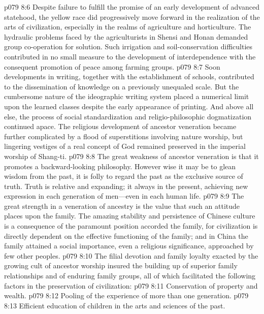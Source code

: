 \vs p079 8:6 Despite failure to fulfill the promise of an early development of advanced statehood, the yellow race did progressively move forward in the realization of the arts of civilization, especially in the realms of agriculture and horticulture. The hydraulic problems faced by the agriculturists in Shensi and Honan demanded group co\hyp{}operation for solution. Such irrigation and soil\hyp{}conservation difficulties contributed in no small measure to the development of interdependence with the consequent promotion of peace among farming groups.
\vs p079 8:7 Soon developments in writing, together with the establishment of schools, contributed to the dissemination of knowledge on a previously unequaled scale. But the cumbersome nature of the ideographic writing system placed a numerical limit upon the learned classes despite the early appearance of printing. And above all else, the process of social standardization and religio\hyp{}philosophic dogmatization continued apace. The religious development of ancestor veneration became further complicated by a flood of superstitions involving nature worship, but lingering vestiges of a real concept of God remained preserved in the imperial worship of Shang\hyp{}ti.
\vs p079 8:8 The great weakness of ancestor veneration is that it promotes a backward\hyp{}looking philosophy. However wise it may be to glean wisdom from the past, it is folly to regard the past as the exclusive source of truth. Truth is relative and expanding; it  always in the present, achieving new expression in each generation of men---even in each human life.
\vs p079 8:9 The great strength in a veneration of ancestry is the value that such an attitude places upon the family. The amazing stability and persistence of Chinese culture is a consequence of the paramount position accorded the family, for civilization is directly dependent on the effective functioning of the family; and in China the family attained a social importance, even a religious significance, approached by few other peoples.
\vs p079 8:10 The filial devotion and family loyalty exacted by the growing cult of ancestor worship insured the building up of superior family relationships and of enduring family groups, all of which facilitated the following factors in the preservation of civilization:
\pc \vs p079 8:11 \bibnobreakspace Conservation of property and wealth.
\vs p079 8:12 \bibnobreakspace Pooling of the experience of more than one generation.
\vs p079 8:13 \bibnobreakspace Efficient education of children in the arts and sciences of the past.
